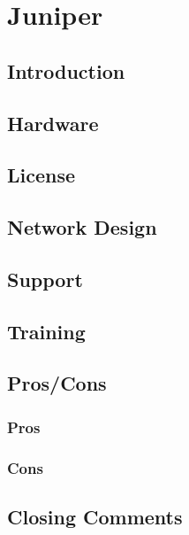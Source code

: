 \section{Juniper}

\subsection{Introduction}
\subsection{Hardware}
\subsection{License}
\subsection{Network Design}
\subsection{Support}
\subsection{Training}
\subsection{{Pros/Cons}}
\subsubsection{Pros}
\subsubsection{Cons}
\subsection{Closing Comments}
